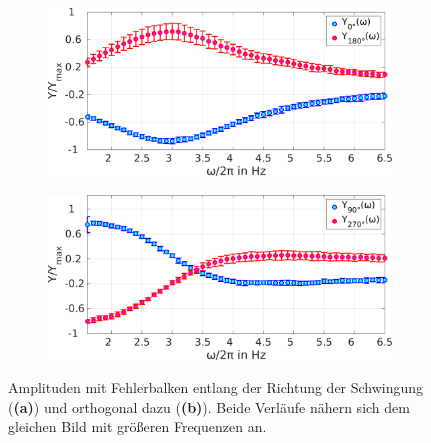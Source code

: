 \documentclass[numbers=noenddot,a4paper,notitlepage,twoside,BCOR15mm]{scrbook}
\newcommand{\fett}[1]{\textbf{#1}}
\begin{document}
						\begin{figure}[!t]
							\centering
							\begin{subfigure}{0.49\textwidth}
								\includegraphics[width=\textwidth,height=0.6\textwidth]{figs/auswertung/phasen/dipolamplitude0180.png}
								\caption{}
							\end{subfigure}
							\begin{subfigure}{0.49\textwidth}
								\includegraphics[width=\textwidth,height=0.6\textwidth]{figs/auswertung/phasen/dipolamplitude90270.png}
								\caption{}
							\end{subfigure}
							\caption{Amplituden mit Fehlerbalken entlang der Richtung der Schwingung (\fett{(a)}) und orthogonal dazu (\fett{(b)}). Beide Verläufe nähern sich dem gleichen Bild mit größeren Frequenzen an.}\label{img:dipolamplituden}
						\end{figure}
\end{document}
